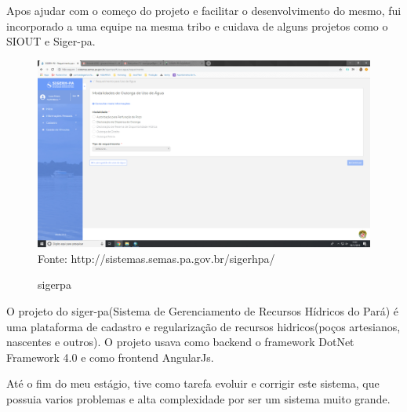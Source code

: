 Apos ajudar com o começo do projeto e facilitar o desenvolvimento do mesmo, fui incorporado a uma equipe na mesma tribo e cuidava de alguns projetos como o SIOUT e Siger-pa.

\begin{figure}[H]
\centering
\caption{sigerpa} %
\includegraphics[scale=0.222]{sigerpa}\\  %
{\small Fonte: http://sistemas.semas.pa.gov.br/sigerhpa/} %
\label{fig:exemplo} %
\end{figure}

O projeto do siger-pa(Sistema de Gerenciamento de Recursos Hídricos do Pará) é uma plataforma de cadastro e regularização de recursos hidricos(poços artesianos, nascentes e outros).
O projeto usava como backend o framework DotNet Framework 4.0 e como frontend AngularJs.

Até o fim do meu estágio, tive como tarefa evoluir e corrigir este sistema, que possuia varios problemas e alta complexidade por ser um sistema muito grande.
